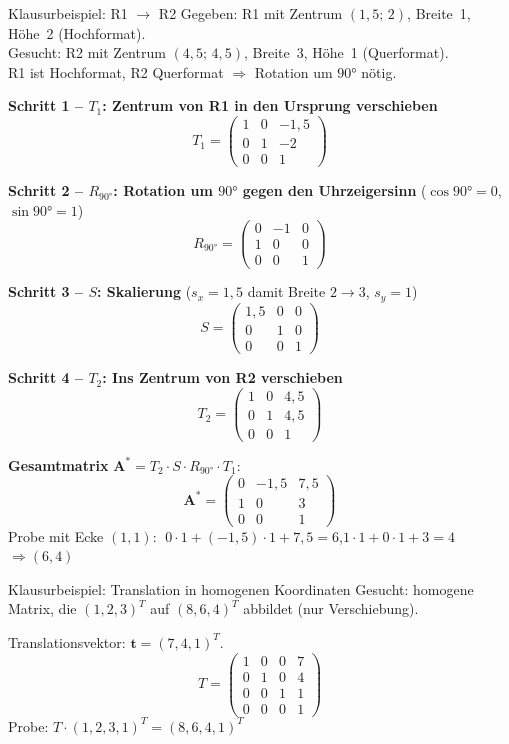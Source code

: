 \documentclass[12pt, a4paper]{article}
\begin{document}
\begin{examplebox}{Klausurbeispiel: R1 $\to$ R2}
Gegeben: R1 mit Zentrum $(1{,}5;\,2)$, Breite~1, Höhe~2 (Hochformat).\\
Gesucht: R2 mit Zentrum $(4{,}5;\,4{,}5)$, Breite~3, Höhe~1 (Querformat).\\
R1 ist Hochformat, R2 Querformat $\Rightarrow$ Rotation um $90°$ nötig.

\textbf{Schritt 1 -- $T_1$: Zentrum von R1 in den Ursprung verschieben}
\[
  T_1 = \begin{pmatrix} 1 & 0 & -1{,}5 \\ 0 & 1 & -2 \\ 0 & 0 & 1 \end{pmatrix}
\]

\textbf{Schritt 2 -- $R_{90°}$: Rotation um $90°$ gegen den Uhrzeigersinn}
($\cos 90° = 0$, $\sin 90° = 1$)
\[
  R_{90°} = \begin{pmatrix} 0 & -1 & 0 \\ 1 & 0 & 0 \\ 0 & 0 & 1 \end{pmatrix}
\]

\textbf{Schritt 3 -- $S$: Skalierung} ($s_x = 1{,}5$ damit Breite $2 \to 3$, $s_y = 1$)
\[
  S = \begin{pmatrix} 1{,}5 & 0 & 0 \\ 0 & 1 & 0 \\ 0 & 0 & 1 \end{pmatrix}
\]

\textbf{Schritt 4 -- $T_2$: Ins Zentrum von R2 verschieben}
\[
  T_2 = \begin{pmatrix} 1 & 0 & 4{,}5 \\ 0 & 1 & 4{,}5 \\ 0 & 0 & 1 \end{pmatrix}
\]

\textbf{Gesamtmatrix} $\mathbf{A}^* = T_2 \cdot S \cdot R_{90°} \cdot T_1$:
\[
  \mathbf{A}^* = \begin{pmatrix} 0 & -1{,}5 & 7{,}5 \\ 1 & 0 & 3 \\ 0 & 0 & 1 \end{pmatrix}
\]
Probe mit Ecke $(1,1)$: $\;0{\cdot}1 + (-1{,}5){\cdot}1 + 7{,}5 = 6$,\quad $1{\cdot}1 + 0{\cdot}1 + 3 = 4$ $\Rightarrow (6,4)$ \checkmark
\end{examplebox}

\begin{examplebox}{Klausurbeispiel: Translation in homogenen Koordinaten}
Gesucht: homogene Matrix, die $(1,2,3)^T$ auf $(8,6,4)^T$ abbildet (nur Verschiebung).

Translationsvektor: $\mathbf{t} = (7,4,1)^T$.
\[
  T = \begin{pmatrix}1&0&0&7\\0&1&0&4\\0&0&1&1\\0&0&0&1\end{pmatrix}
\]
Probe: $T\cdot(1,2,3,1)^T = (8,6,4,1)^T$ \checkmark
\end{examplebox}
\end{document}
